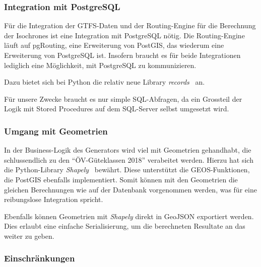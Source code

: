 \subsubsection{Integration mit PostgreSQL}
\label{analyse_generator:Integration mit PostgreSQL}

Für die Integration der GTFS-Daten und der Routing-Engine für die Berechnung der \glspl{Isochrone} ist eine Integration mit PostgreSQL nötig.
Die Routing-Engine läuft auf pgRouting, eine Erweiterung von PostGIS, das wiederum eine Erweiterung von PostgreSQL ist.
Insofern braucht es für beide Integrationen lediglich eine Möglichkeit, mit PostgreSQL zu kommunizieren.

Dazu bietet sich bei Python die relativ neue Library \emph{records}~\cite{records} an.

Für unsere Zwecke braucht es nur simple SQL-Abfragen, da ein Grossteil der Logik mit \glspl{Stored Procedure} auf dem SQL-Server selbst umgesetzt wird.

\subsubsection{Umgang mit Geometrien}
\label{analyse_generator: Umgang mit Geometrien}

In der Business-Logik des Generators wird viel mit Geometrien gehandhabt, die schlussendlich zu den "`ÖV-Güteklassen 2018"' verabeitet werden.
Hierzu hat sich die Python-Library \emph{Shapely}~\cite{shapely} bewährt.
Diese unterstützt die \gls{GEOS}-Funktionen, die PostGIS ebenfalls implementiert.
Somit können mit den Geometrien die gleichen Berechnungen wie auf der Datenbank vorgenommen werden, was für eine reibungslose Integration spricht.

Ebenfalls können Geometrien mit \emph{Shapely} direkt in \gls{GeoJSON} exportiert werden.
Dies erlaubt eine einfache Serialisierung, um die berechneten Resultate an das  weiter zu geben.


\subsubsection{Einschränkungen}
\label{Analyse:Einschränkungen}

